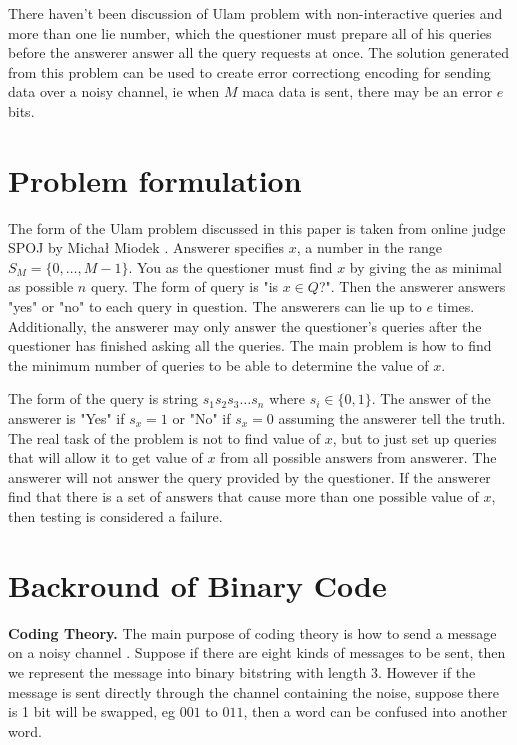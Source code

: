 \documentclass{TTP_DSL2006}
\begin{document}
There haven't been discussion of Ulam problem with non-interactive queries and more than one lie number, which the questioner must prepare all of his queries before the answerer answer all the query requests at once. The solution generated from this problem can be used to create error correctiong encoding for sending data over a noisy channel, ie when $M$ maca data is sent, there may be an error $e$ bits.

\section{Problem formulation}

The form of the Ulam problem discussed in this paper is taken from online judge SPOJ by Micha\l{} Miodek \cite{guessn5}. Answerer specifies $x$, a number in the range $S_M = \{0, \ldots, M-1 \}$. You as the questioner must find $x$ by giving the as minimal as possible $n$ query. The form of query is "is $x \in Q$?". Then the answerer answers "yes" or "no" to each query in question. The answerers can lie up to $e$ times. Additionally, the answerer may only answer the questioner's queries after the questioner has finished asking all the queries. The main problem is how to find the minimum number of queries to be able to determine the value of $x$.

The form of the query is string $s_1s_2s_3\ldots s_n$ where $s_i \in \{0,1\}$. The answer of the answerer is "Yes" if $s_x = 1$ or "No" if $s_x = 0$ assuming the answerer tell the truth. The real task of the problem is not to find value of $x$, but to just set up queries that will allow it to get value of $x$ from all possible answers from answerer. The answerer will not answer the query provided by the questioner. If the answerer find that there is a set of answers that cause more than one possible value of $x$, then testing is considered a failure.


\section{Backround of Binary Code}

\noindent \textbf{Coding Theory.}
The main purpose of coding theory is how to send a message on a noisy channel \cite{VanLint2016}. Suppose if there are eight kinds of messages to be sent, then we represent the message into binary bitstring with length 3. However if the message is sent directly through the channel containing the noise, suppose there is 1 bit will be swapped, eg $001$ to $011$, then a word can be confused into another word.
\end{document}
